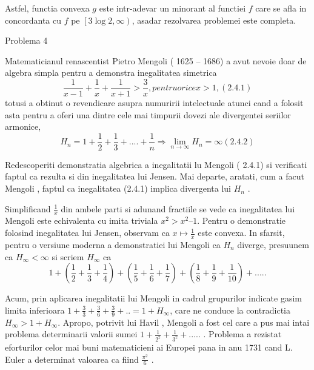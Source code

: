 \documentclass[a4paper,12pt,oneside]{report}
\begin{document}
Astfel, functia convexa \(g\) este intr-adevar un minorant al functiei \(f\) care se afla in concordanta cu \(f\) pe \(\left [ 3\log 2 , \infty  \right )\), asadar rezolvarea problemei este completa. 

Problema 4

   Matematicianul renascentist Pietro Mengoli ( 1625 – 1686) a avut nevoie doar de algebra simpla pentru a demonstra inegalitatea simetrica 
 \begin{displaymath}
   \frac{1}{x - 1} + \frac{1}{x} + \frac{1}{x + 1} > \frac{3}{x} , pentru orice x > 1, (2.4.1)
 \end{displaymath}
totusi a obtinut o revendicare asupra numuririi intelectuale atunci cand a folosit asta pentru a oferi una dintre cele mai timpurii dovezi ale divergentei seriilor armonice, 
\begin{displaymath}
  H_{n} = 1 + \frac{1}{2} + \frac{1}{3} + ....+ \frac{1}{n} \Rightarrow \lim_{n \to \infty } H_{n} = \infty ( 2.4.2)
\end{displaymath}

Redescoperiti demonstratia algebrica a inegalitatii lu Mengoli ( 2.4.1) si verificati faptul ca rezulta si din inegalitatea lui Jensen. Mai departe, aratati, cum a facut Mengoli , faptul ca inegalitatea (2.4.1) implica divergenta lui \(H_{n}\) . 

Simplificand \(\frac{1}{x}\) din ambele parti si adunand fractiile se vede ca inegalitatea lui Mengoli este echivalenta cu imita triviala \(x^{2} >  x^{2} – 1\). Pentru o demonstratie folosind inegalitatea lui Jensen, observam ca \(x \mapsto \frac{1}{x}\) este convexa. In sfarsit, pentru o versiune moderna a demonstratiei lui Mengoli ca \(H_{n}\) diverge, presuunem ca \(H_{\infty }< \infty\) si scriem \(H_{\infty }\) ca 
\begin{displaymath}
  1 + \left ( \frac{1}{2} + \frac{1}{3} + \frac{1}{4} \right ) + \left ( \frac{1}{5} + \frac{1}{6} + \frac{1}{7} \right ) + \left ( \frac{1}{8} + \frac{1}{9} +\frac{1}{10} \right )+.... . 
\end{displaymath}

Acum, prin aplicarea inegalitatii lui Mengoli in cadrul grupurilor indicate gasim limita inferioara \(1 + \frac{3}{3} + \frac{3}{6} + \frac{3}{9} + ..= 1 + H_{\infty }\), care ne conduce la contradictia \(H_{\infty } > 1 + H_{\infty }\). Apropo, potrivit lui Havil , Mengoli a fost cel care a pus mai intai problema determinarii valorii sumei \(1 + \frac{1}{2^{2}} + \frac{1}{3^{2}} + .....\) .
Problema a rezistat eforturilor celor mai buni matematicieni ai Europei pana in anu 1731 cand L. Euler a determinat valoarea ca fiind \(\frac{\pi^{2}}{6}\) . 
\end{document}
